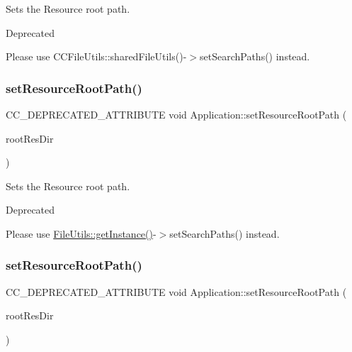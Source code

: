 Sets the Resource root path. \begin{DoxyRefDesc}{Deprecated}
\item[\hyperlink{deprecated__deprecated000131}{Deprecated}]Please use C\+C\+File\+Utils\+::shared\+File\+Utils()-\/$>$set\+Search\+Paths() instead. \end{DoxyRefDesc}
\mbox{\label{classApplication_a0df1abee182d6a9f3d2a318941aace4f}} 
\subsubsection{\texorpdfstring{set\+Resource\+Root\+Path()}{setResourceRootPath()}\hspace{0.1cm}{\footnotesize\ttfamily [2/8]}}
{\footnotesize\ttfamily C\+C\+\_\+\+D\+E\+P\+R\+E\+C\+A\+T\+E\+D\+\_\+\+A\+T\+T\+R\+I\+B\+U\+TE void Application\+::set\+Resource\+Root\+Path (\begin{DoxyParamCaption}\item[{const std\+::string \&}]{root\+Res\+Dir }\end{DoxyParamCaption})}

Sets the Resource root path. \begin{DoxyRefDesc}{Deprecated}
\item[\hyperlink{deprecated__deprecated000129}{Deprecated}]Please use \hyperlink{classFileUtils_ac8ced4394d59f5459445ced27ccd0e8a}{File\+Utils\+::get\+Instance()}-\/$>$set\+Search\+Paths() instead. \end{DoxyRefDesc}
\mbox{\label{classApplication_a0df1abee182d6a9f3d2a318941aace4f}} 
\subsubsection{\texorpdfstring{set\+Resource\+Root\+Path()}{setResourceRootPath()}\hspace{0.1cm}{\footnotesize\ttfamily [3/8]}}
{\footnotesize\ttfamily C\+C\+\_\+\+D\+E\+P\+R\+E\+C\+A\+T\+E\+D\+\_\+\+A\+T\+T\+R\+I\+B\+U\+TE void Application\+::set\+Resource\+Root\+Path (\begin{DoxyParamCaption}\item[{const std\+::string \&}]{root\+Res\+Dir }\end{DoxyParamCaption})}

